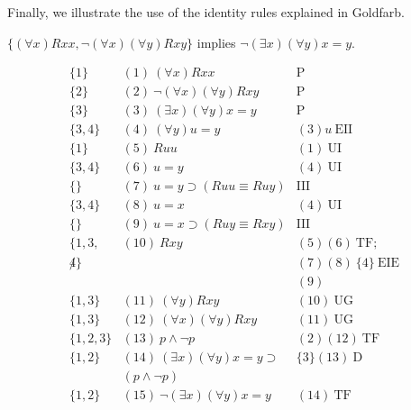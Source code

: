 Finally, we illustrate the use of the identity rules explained in Goldfarb. 
\begin{center}
$\{(\forall x) Rxx, \neg (\forall x)(\forall y) Rxy \}$
implies $\neg (\exists x)(\forall y) x = y$.
\end{center}
\[
\begin{array}{lll}
\{1\}   & (1)\ (\forall x) Rxx  & \mathrm{P}\\
\{2\}   & (2)\ \neg (\forall x)(\forall y) Rxy  & \mathrm{P}\\
\{3\}   & (3)\ (\exists x)(\forall y) x = y  & \mathrm{P}\\
\{3,4\}   & (4)\ (\forall y) u = y  & (3)u\ \mathrm{EII}\\
\{1\}   & (5)\ Ruu  & (1)\ \mathrm{UI}\\
\{3,4\}   & (6)\ u=y  & (4)\ \mathrm{UI}\\
\{\}   & (7)\ u=y \supset (Ruu \equiv Ruy) & \mathrm{III}\\
\{3,4\}   & (8)\ u=x  & (4)\ \mathrm{UI}\\
\{\}   & (9)\ u=x \supset (Ruy \equiv Rxy) & \mathrm{III}\\
\{1,3,   & (10)\ Rxy  & (5)(6)\ \mathrm{TF};\\
\not4\} &  & (7)(8)\ \{4\}\ \mathrm{EIE} \\
 & & (9)\\
\{1,3\}   & (11)\ (\forall y)Rxy  & (10)\ \mathrm{UG}\\
\{1,3\}   & (12)\ (\forall x)(\forall y)Rxy  & (11)\ \mathrm{UG}\\
\{1,2,3\}   & (13)\ p \wedge \neg p  & (2)(12)\ \mathrm{TF}\\
\{1,2\}   & (14)\ (\exists x)(\forall y) x = y  \supset
& \{3\}(13)\ \mathrm{D}\\
 & (p \wedge \neg p) & \\
\{1,2\}   & (15)\ \neg (\exists x)(\forall y) x = y  & (14)\ \mathrm{TF}
\end{array}
\]

